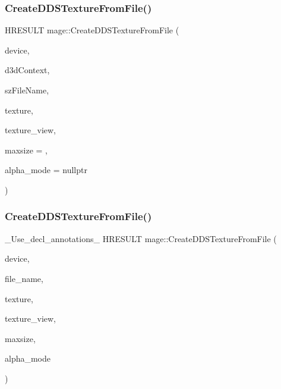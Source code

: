 \subsubsection{\texorpdfstring{Create\+D\+D\+S\+Texture\+From\+File()}{CreateDDSTextureFromFile()}\hspace{0.1cm}{\footnotesize\ttfamily [2/4]}}
{\footnotesize\ttfamily H\+R\+E\+S\+U\+LT mage\+::\+Create\+D\+D\+S\+Texture\+From\+File (\begin{DoxyParamCaption}\item[{\+\_\+\+In\+\_\+ \hyperlink{namespacemage_ae74f374780900893caa5555d1031fd79}{Com\+Ptr}$<$ I\+D3\+D11\+Device2 $>$}]{device,  }\item[{\+\_\+\+In\+\_\+opt\+\_\+ I\+D3\+D11\+Device\+Context $\ast$}]{d3d\+Context,  }\item[{\+\_\+\+In\+\_\+z\+\_\+ const wchar\+\_\+t $\ast$}]{sz\+File\+Name,  }\item[{\+\_\+\+Outptr\+\_\+opt\+\_\+ I\+D3\+D11\+Resource $\ast$$\ast$}]{texture,  }\item[{\+\_\+\+Outptr\+\_\+opt\+\_\+ I\+D3\+D11\+Shader\+Resource\+View $\ast$$\ast$}]{texture\+\_\+view,  }\item[{\+\_\+\+In\+\_\+ size\+\_\+t}]{maxsize = {},  }\item[{\+\_\+\+Out\+\_\+opt\+\_\+ \hyperlink{namespacemage_a0c586a2bad862f4858900ca121ca80c2}{D\+D\+S\+\_\+\+A\+L\+P\+H\+A\+\_\+\+M\+O\+DE} $\ast$}]{alpha\+\_\+mode = {\ttfamily nullptr} }\end{DoxyParamCaption})}

\hypertarget{namespacemage_a453361f8ce0316486ec3907547674224}{}\label{namespacemage_a453361f8ce0316486ec3907547674224} 
\subsubsection{\texorpdfstring{Create\+D\+D\+S\+Texture\+From\+File()}{CreateDDSTextureFromFile()}\hspace{0.1cm}{\footnotesize\ttfamily [3/4]}}
{\footnotesize\ttfamily \+\_\+\+Use\+\_\+decl\+\_\+annotations\+\_\+ H\+R\+E\+S\+U\+LT mage\+::\+Create\+D\+D\+S\+Texture\+From\+File (\begin{DoxyParamCaption}\item[{\hyperlink{namespacemage_ae74f374780900893caa5555d1031fd79}{Com\+Ptr}$<$ I\+D3\+D11\+Device2 $>$}]{device,  }\item[{const wchar\+\_\+t $\ast$}]{file\+\_\+name,  }\item[{I\+D3\+D11\+Resource $\ast$$\ast$}]{texture,  }\item[{I\+D3\+D11\+Shader\+Resource\+View $\ast$$\ast$}]{texture\+\_\+view,  }\item[{size\+\_\+t}]{maxsize,  }\item[{\hyperlink{namespacemage_a0c586a2bad862f4858900ca121ca80c2}{D\+D\+S\+\_\+\+A\+L\+P\+H\+A\+\_\+\+M\+O\+DE} $\ast$}]{alpha\+\_\+mode }\end{DoxyParamCaption})}

